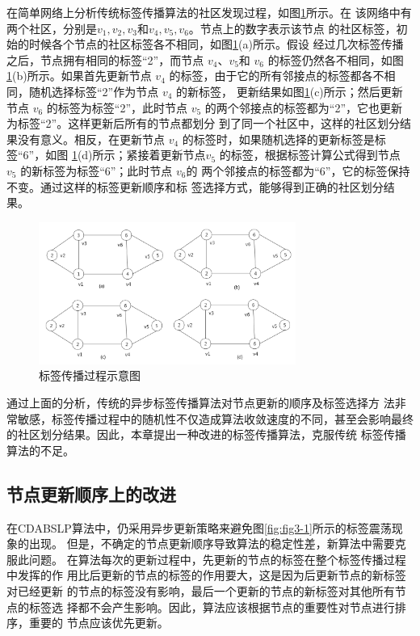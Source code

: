 在简单网络上分析传统标签传播算法的社区发现过程，如图\ref{fig:fig3-2}所示。在
该网络中有两个社区，分别是${v_1,v_2,v_3}$和${v_4,v_5,v_6}$。节点上的数字表示该节点
的社区标签，初始的时候各个节点的社区标签各不相同，如图\ref{fig:fig3-2}(a)所示。假设
经过几次标签传播之后，节点拥有相同的标签“2”，而节点 $v_4$、$v_5$和 $v_6$
的标签仍然各不相同，如图\ref{fig:fig3-2}(b)所示。如果首先更新节点 $v_4$
的标签，由于它的所有邻接点的标签都各不相同，随机选择标签“2”作为节点 $v_4$
的新标签，
更新结果如图\ref{fig:fig3-2}(c)所示；然后更新节点 $v_6$
的标签为标签“2”，此时节点 $v_5$
的两个邻接点的标签都为“2”，它也更新为标签“2”。这样更新后所有的节点都划分
到了同一个社区中，这样的社区划分结果没有意义。相反，在更新节点 $v_4$
的标签时，如果随机选择的更新标签是标签“6”，如图 \ref{fig:fig3-2}(d)所示；紧接着更新节点$v_5$
的标签，根据标签计算公式得到节点 $v_5$
的新标签为标签“6”；此时节点 $v_6$的
两个邻接点的标签都为“6”，它的标签保持不变。通过这样的标签更新顺序和标
签选择方式，能够得到正确的社区划分结果。

\begin{figure}
  \centering
  \includegraphics[width=0.75\textwidth]{figures/fig3-2}
  \caption{标签传播过程示意图}\label{fig:fig3-2}
\end{figure}

通过上面的分析，传统的异步标签传播算法对节点更新的顺序及标签选择方
法非常敏感，标签传播过程中的随机性不仅造成算法收敛速度的不同，甚至会影响最终的社区划分结果。因此，本章提出一种改进的标签传播算法，克服传统
标签传播算法的不足。

\subsection{节点更新顺序上的改进}
在CDABSLP算法中，仍采用异步更新策略来避免图\ref{fig:fig3-1}所示的标签震荡现象的出现。
但是，不确定的节点更新顺序导致算法的稳定性差，新算法中需要克服此问题。
在算法每次的更新过程中，先更新的节点的标签在整个标签传播过程中发挥的作
用比后更新的节点的标签的作用要大，这是因为后更新节点的新标签对已经更新
的节点的标签没有影响，最后一个更新的节点的新标签对其他所有节点的标签选
择都不会产生影响。因此，算法应该根据节点的重要性对节点进行排序，重要的
节点应该优先更新。 

